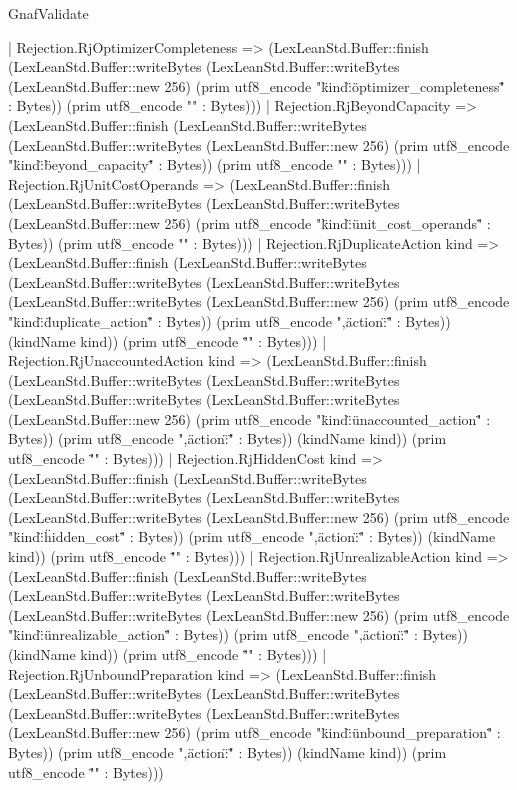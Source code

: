 \begin{lexlean}{GnafValidate}
\begin{semanticmodule}
{    | Rejection.RjOptimizerCompleteness => (LexLeanStd.Buffer::finish (LexLeanStd.Buffer::writeBytes (LexLeanStd.Buffer::writeBytes (LexLeanStd.Buffer::new 256) (prim utf8_encode "{\"kind\":\"optimizer_completeness\"" : Bytes)) (prim utf8_encode "}" : Bytes)))
    | Rejection.RjBeyondCapacity => (LexLeanStd.Buffer::finish (LexLeanStd.Buffer::writeBytes (LexLeanStd.Buffer::writeBytes (LexLeanStd.Buffer::new 256) (prim utf8_encode "{\"kind\":\"beyond_capacity\"" : Bytes)) (prim utf8_encode "}" : Bytes)))
    | Rejection.RjUnitCostOperands => (LexLeanStd.Buffer::finish (LexLeanStd.Buffer::writeBytes (LexLeanStd.Buffer::writeBytes (LexLeanStd.Buffer::new 256) (prim utf8_encode "{\"kind\":\"unit_cost_operands\"" : Bytes)) (prim utf8_encode "}" : Bytes)))
    | Rejection.RjDuplicateAction kind => (LexLeanStd.Buffer::finish (LexLeanStd.Buffer::writeBytes (LexLeanStd.Buffer::writeBytes (LexLeanStd.Buffer::writeBytes (LexLeanStd.Buffer::writeBytes (LexLeanStd.Buffer::new 256) (prim utf8_encode "{\"kind\":\"duplicate_action\"" : Bytes)) (prim utf8_encode ",\"action\":\"" : Bytes)) (kindName kind)) (prim utf8_encode "\"}" : Bytes)))
    | Rejection.RjUnaccountedAction kind => (LexLeanStd.Buffer::finish (LexLeanStd.Buffer::writeBytes (LexLeanStd.Buffer::writeBytes (LexLeanStd.Buffer::writeBytes (LexLeanStd.Buffer::writeBytes (LexLeanStd.Buffer::new 256) (prim utf8_encode "{\"kind\":\"unaccounted_action\"" : Bytes)) (prim utf8_encode ",\"action\":\"" : Bytes)) (kindName kind)) (prim utf8_encode "\"}" : Bytes)))
    | Rejection.RjHiddenCost kind => (LexLeanStd.Buffer::finish (LexLeanStd.Buffer::writeBytes (LexLeanStd.Buffer::writeBytes (LexLeanStd.Buffer::writeBytes (LexLeanStd.Buffer::writeBytes (LexLeanStd.Buffer::new 256) (prim utf8_encode "{\"kind\":\"hidden_cost\"" : Bytes)) (prim utf8_encode ",\"action\":\"" : Bytes)) (kindName kind)) (prim utf8_encode "\"}" : Bytes)))
    | Rejection.RjUnrealizableAction kind => (LexLeanStd.Buffer::finish (LexLeanStd.Buffer::writeBytes (LexLeanStd.Buffer::writeBytes (LexLeanStd.Buffer::writeBytes (LexLeanStd.Buffer::writeBytes (LexLeanStd.Buffer::new 256) (prim utf8_encode "{\"kind\":\"unrealizable_action\"" : Bytes)) (prim utf8_encode ",\"action\":\"" : Bytes)) (kindName kind)) (prim utf8_encode "\"}" : Bytes)))
    | Rejection.RjUnboundPreparation kind => (LexLeanStd.Buffer::finish (LexLeanStd.Buffer::writeBytes (LexLeanStd.Buffer::writeBytes (LexLeanStd.Buffer::writeBytes (LexLeanStd.Buffer::writeBytes (LexLeanStd.Buffer::new 256) (prim utf8_encode "{\"kind\":\"unbound_preparation\"" : Bytes)) (prim utf8_encode ",\"action\":\"" : Bytes)) (kindName kind)) (prim utf8_encode "\"}" : Bytes)))
}
\end{semanticmodule}
\end{lexlean}
